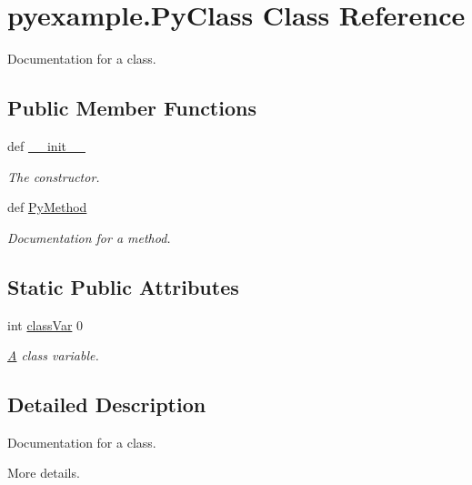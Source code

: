\hypertarget{classpyexample_1_1_py_class}{\section{pyexample.\-Py\-Class Class Reference}
\label{classpyexample_1_1_py_class}
}


Documentation for a class.  


\subsection*{Public Member Functions}
\begin{DoxyCompactItemize}
\item 
def \hyperlink{classpyexample_1_1_py_class_aa030fc201e82d9ac3fdb3e8afda712cc}{\-\_\-\-\_\-init\-\_\-\-\_\-}
\begin{DoxyCompactList}\small\item\em The constructor. \end{DoxyCompactList}\item 
def \hyperlink{classpyexample_1_1_py_class_aa60932a2e75f67ddbe84dda601be6327}{Py\-Method}
\begin{DoxyCompactList}\small\item\em Documentation for a method. \end{DoxyCompactList}\end{DoxyCompactItemize}
\subsection*{Static Public Attributes}
\begin{DoxyCompactItemize}
\item 
int \hyperlink{classpyexample_1_1_py_class_abd17aff54e5b0ca194020c796c733546}{class\-Var} 0
\begin{DoxyCompactList}\small\item\em \hyperlink{class_a}{A} class variable. \end{DoxyCompactList}\end{DoxyCompactItemize}


\subsection{Detailed Description}
Documentation for a class. 

More details. 

